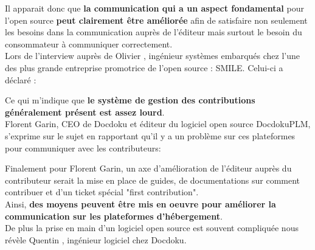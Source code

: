 			Il apparait donc que \textbf{la communication qui a un aspect fondamental} pour l'open source \textbf{peut clairement être améliorée} afin de satisfaire non seulement les besoins dans la communication auprès de l'éditeur mais surtout le besoin du consommateur à communiquer correctement.\\

			Lors de l'interview auprès de Olivier , ingénieur systèmes embarqués chez l'une des plus grande entreprise promotrice de l'open source : SMILE. Celui-ci a déclaré : 

			\begin{center}
				\textit{
				}
			\end{center}

			Ce qui m'indique que \textbf{le système de gestion des contributions généralement présent est assez lourd}.\\

			Florent Garin, CEO de Docdoku et éditeur du logiciel open source DocdokuPLM, s'exprime sur le sujet en rapportant qu'il y a un problème sur ces plateformes pour communiquer avec les contributeurs:

			\begin{center}
				\textit{
				}
			\end{center}

			Finalement pour Florent Garin, un axe d'amélioration de l'éditeur auprès du contributeur serait la mise en place de guides, de documentations sur comment contribuer et d'un ticket spécial "first contribution".\\

			Ainsi, \textbf{des moyens peuvent être mis en oeuvre pour améliorer la communication sur les plateformes d'hébergement}.\\

			De plus la prise en main d'un logiciel open source est souvent compliquée nous révèle Quentin , ingénieur logiciel chez Docdoku.\\

